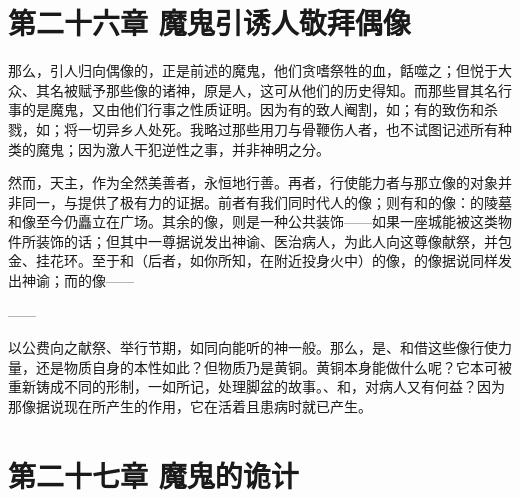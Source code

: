 
\section{第二十六章 魔鬼引诱人敬拜偶像}

那么，引人归向偶像的，正是前述的魔鬼，他们贪嗜祭牲的血，餂噬之；但悦于大众、其名被赋予那些像的诸神，原是人，这可从他们的历史得知。而那些冒其名行事的是魔鬼，又由他们行事之性质证明。因为有的致人阉割，如；有的致伤和杀戮，如；将一切异乡人处死。我略过那些用刀与骨鞭伤人者，也不试图记述所有种类的魔鬼；因为激人干犯逆性之事，并非神明之分。\par

\par

然而，天主，作为全然美善者，永恒地行善。再者，行使能力者与那立像的对象并非同一，与提供了极有力的证据。前者有我们同时代人的像；则有和的像：的陵墓和像至今仍矗立在广场。其余的像，则是一种公共装饰——如果一座城能被这类物件所装饰的话；但其中一尊据说发出神谕、医治病人，为此人向这尊像献祭，并包金、挂花环。至于和（后者，如你所知，在附近投身火中）的像，的像据说同样发出神谕；而的像——\par

 ——\par

以公费向之献祭、举行节期，如同向能听的神一般。那么，是、和借这些像行使力量，还是物质自身的本性如此？但物质乃是黄铜。黄铜本身能做什么呢？它本可被重新铸成不同的形制，一如所记，处理脚盆的故事。、和，对病人又有何益？因为那像据说现在所产生的作用，它在活着且患病时就已产生。\par


\section{第二十七章 魔鬼的诡计}

